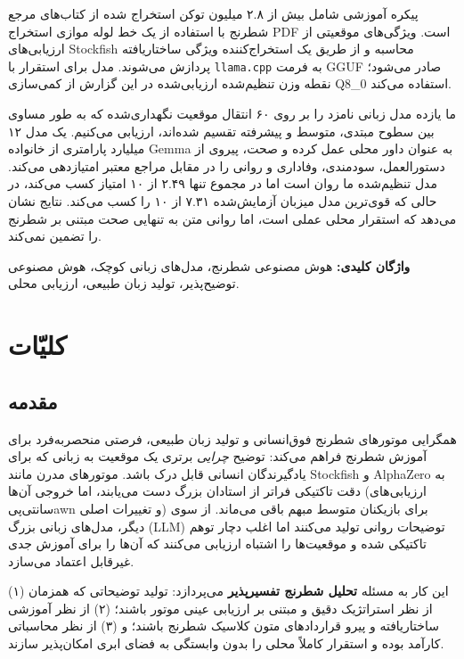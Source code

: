 \documentclass[a4paper,12pt]{report}
\begin{document}
پیکره آموزشی شامل بیش از ۲.۸ میلیون توکن استخراج شده از کتاب‌های مرجع شطرنج با استفاده از یک خط لوله موازی استخراج PDF است. ویژگی‌های موقعیتی از ارزیابی‌های Stockfish محاسبه و از طریق یک استخراج‌کننده ویژگی ساختاریافته پردازش می‌شوند. مدل برای استقرار با \texttt{llama.cpp} به فرمت GGUF صادر می‌شود؛ نقطه وزن تنظیم‌شده ارزیابی‌شده در این گزارش از کمی‌سازی Q8\_0 استفاده می‌کند.

ما یازده مدل زبانی نامزد را بر روی ۶۰ انتقال موقعیت نگهداری‌شده که به طور مساوی بین سطوح مبتدی، متوسط و پیشرفته تقسیم شده‌اند، ارزیابی می‌کنیم. یک مدل ۱۲ میلیارد پارامتری از خانواده Gemma به عنوان داور محلی عمل کرده و صحت، پیروی از دستورالعمل، سودمندی، وفاداری و روانی را در مقابل مراجع معتبر امتیازدهی می‌کند. مدل تنظیم‌شده ما روان است اما در مجموع تنها ۲.۴۹ از ۱۰ امتیاز کسب می‌کند، در حالی که قوی‌ترین مدل میزبان آزمایش‌شده ۷.۳۱ از ۱۰ را کسب می‌کند. نتایج نشان می‌دهد که استقرار محلی عملی است، اما روانی متن به تنهایی صحت مبتنی بر شطرنج را تضمین نمی‌کند.

\vspace{0.5cm}
\noindent \textbf{واژگان کلیدی:} هوش مصنوعی شطرنج، مدل‌های زبانی کوچک، هوش مصنوعی توضیح‌پذیر، تولید زبان طبیعی، ارزیابی محلی.

\tableofcontents
\newpage

\chapter{کلیّات}
\section{مقدمه}
همگرایی موتورهای شطرنج فوق‌انسانی و تولید زبان طبیعی، فرصتی منحصر‌به‌فرد برای آموزش شطرنج فراهم می‌کند: توضیح \emph{چرایی} برتری یک موقعیت به زبانی که برای یادگیرندگان انسانی قابل درک باشد. موتورهای مدرن مانند Stockfish و AlphaZero به دقت تاکتیکی فراتر از استادان بزرگ دست می‌یابند، اما خروجی آن‌ها (ارزیابی‌های سانتی‌پیawn و تغییرات اصلی) برای بازیکنان متوسط مبهم باقی می‌ماند. از سوی دیگر، مدل‌های زبانی بزرگ (LLM) توضیحات روانی تولید می‌کنند اما اغلب دچار توهم تاکتیکی شده و موقعیت‌ها را اشتباه ارزیابی می‌کنند که آن‌ها را برای آموزش جدی غیرقابل اعتماد می‌سازد.

این کار به مسئله \textbf{تحلیل شطرنج تفسیرپذیر} می‌پردازد: تولید توضیحاتی که همزمان (۱) از نظر استراتژیک دقیق و مبتنی بر ارزیابی عینی موتور باشند؛ (۲) از نظر آموزشی ساختاریافته و پیرو قراردادهای متون کلاسیک شطرنج باشند؛ و (۳) از نظر محاسباتی کارآمد بوده و استقرار کاملاً محلی را بدون وابستگی به فضای ابری امکان‌پذیر سازند.
\end{document}
